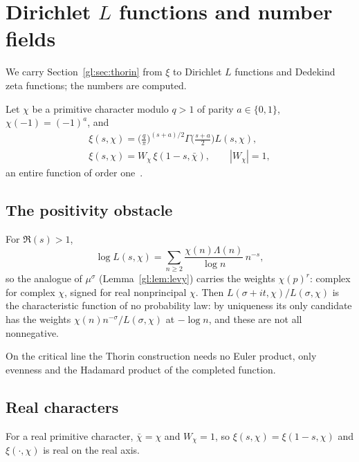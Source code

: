 \section{Dirichlet \texorpdfstring{$L$}{L} functions and number fields}\label{gl:sec:Lchi}

We carry Section~\ref{gl:sec:thorin} from $\xi$ to Dirichlet $L$ functions and Dedekind zeta functions; the numbers are computed.

Let $\chi$ be a primitive character modulo $q>1$ of parity $a\in\{0,1\}$, $\chi(-1)=(-1)^a$, and
\begin{gather*}
\xi(s,\chi) = \Big(\frac q\pi\Big)^{(s+a)/2}\Gamma\Big(\frac{s+a}{2}\Big)L(s,\chi),\\
\xi(s,\chi) = W_\chi\,\xi(1-s,\bar\chi),\qquad |W_\chi|=1,
\end{gather*}
an entire function of order one~\cite{Davenport}.

\subsection{The positivity obstacle}\label{gl:sec:obstacle}

For $\Re(s)>1$,
\begin{equation}\label{gl:eq:Lchi}
\log L(s,\chi)=\sum_{n\ge2}\frac{\chi(n)\Lambda(n)}{\log n}\,n^{-s},
\end{equation}
so the analogue of $\mu^\sigma$ (Lemma~\ref{gl:lem:levy}) carries the weights $\chi(p)^r$: complex for complex $\chi$, signed for real nonprincipal $\chi$. Then $L(\sigma+it,\chi)/L(\sigma,\chi)$ is the characteristic function of no probability law: by uniqueness its only candidate has the weights $\chi(n)n^{-\sigma}/L(\sigma,\chi)$ at $-\log n$, and these are not all nonnegative.

On the critical line the Thorin construction needs no Euler product, only evenness and the Hadamard product of the completed function.

\subsection{Real characters}

For a real primitive character, $\bar\chi=\chi$ and $W_\chi=1$, so $\xi(s,\chi)=\xi(1-s,\chi)$ and $\xi(\cdot,\chi)$ is real on the real axis.

